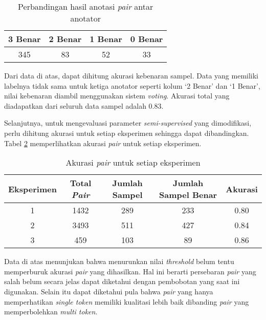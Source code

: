 \begin{table}
  \centering
  \caption{Perbandingan hasil anotasi \textit{pair} antar anotator}
  \label{table:jumlah-bs}
  \begin{tabular}{|c|c|c|c|}
  \hline
  3 Benar & 2 Benar & 1 Benar & 0 Benar \\ \hline
  345 & 83 & 52 & 33 \\ \hline
  \end{tabular} 
\end{table}

Dari data di atas, dapat dihitung akurasi kebenaran sampel. Data yang memiliki labelnya tidak sama untuk ketiga anotator seperti kolum `2 Benar' dan `1 Benar', nilai kebenaran diambil menggunakan sistem \textit{voting}. Akurasi total yang diadapatkan dari seluruh data sampel adalah 0.83.

Selanjutnya, untuk mengevaluasi parameter \textit{semi-supervised} yang dimodifikasi, perlu dihitung akurasi untuk setiap eksperimen sehingga dapat dibandingkan. Tabel \ref{table:akurasi-all} memperlihatkan akurasi \textit{pair} untuk setiap eksperimen.

\begin{table}
  \centering
  \caption{Akurasi \textit{pair} untuk setiap eksperimen}
  \label{table:akurasi-all}
  \begin{tabular}{|c|c|c|c|c|}
  \hline
  Eksperimen & Total \textit{Pair} & Jumlah Sampel & Jumlah Sampel Benar & Akurasi \\ \hline
  1 & 1432 & 289 & 233 & 0.80 \\ \hline
  2 & 3493 & 511 & 427 & 0.84 \\ \hline
  3 & 459  & 103 & 89  & 0.86 \\ \hline
  \end{tabular} 
\end{table}

Data di atas menunjukan bahwa menurunkan nilai \textit{threshold} belum tentu memperburuk akurasi \textit{pair} yang dihasilkan. Hal ini berarti persebaran \textit{pair} yang salah belum secara jelas dapat diketahui dengan pembobotan yang saat ini digunakan. Selain itu dapat diketahui pula bahwa \textit{pair} yang hanya memperhatikan \textit{single token} memiliki kualitasi lebih baik dibanding \textit{pair} yang memperbolehkan \textit{multi token}.

